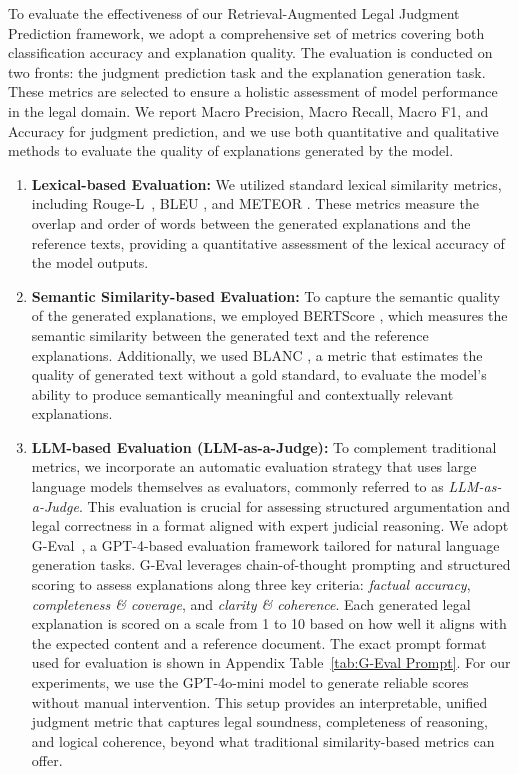 To evaluate the effectiveness of our Retrieval-Augmented Legal Judgment Prediction framework, we adopt a comprehensive set of metrics covering both classification accuracy and explanation quality. The evaluation is conducted on two fronts: the judgment prediction task and the explanation generation task. These metrics are selected to ensure a holistic assessment of model performance in the legal domain. We report Macro Precision, Macro Recall, Macro F1, and Accuracy for judgment prediction, and we use both quantitative and qualitative methods to evaluate the quality of explanations generated by the model.

\begin{enumerate}
    \item \textbf{Lexical-based Evaluation:} We utilized standard lexical similarity metrics, including Rouge-L~\cite{lin-2004-rouge}, BLEU \cite{papineni-etal-2002-bleu}, and METEOR \cite{banerjee-lavie-2005-meteor}. These metrics measure the overlap and order of words between the generated explanations and the reference texts, providing a quantitative assessment of the lexical accuracy of the model outputs.

    \item \textbf{Semantic Similarity-based Evaluation:} To capture the semantic quality of the generated explanations, we employed BERTScore \cite{BERTScore}, which measures the semantic similarity between the generated text and the reference explanations. Additionally, we used BLANC \cite{blanc}, a metric that estimates the quality of generated text without a gold standard, to evaluate the model's ability to produce semantically meaningful and contextually relevant explanations.

    \item \textbf{LLM-based Evaluation (LLM-as-a-Judge):} To complement traditional metrics, we incorporate an automatic evaluation strategy that uses large language models themselves as evaluators, commonly referred to as \textit{LLM-as-a-Judge}. This evaluation is crucial for assessing structured argumentation and legal correctness in a format aligned with expert judicial reasoning. We adopt G-Eval~\cite{liu-etal-2023-g}, a GPT-4-based evaluation framework tailored for natural language generation tasks. G-Eval leverages chain-of-thought prompting and structured scoring to assess explanations along three key criteria: \textit{factual accuracy}, \textit{completeness \& coverage}, and \textit{clarity \& coherence}. Each generated legal explanation is scored on a scale from 1 to 10 based on how well it aligns with the expected content and a reference document. The exact prompt format used for evaluation is shown in Appendix Table~\ref{tab:G-Eval Prompt}. For our experiments, we use the GPT-4o-mini model to generate reliable scores without manual intervention. This setup provides an interpretable, unified judgment metric that captures legal soundness, completeness of reasoning, and logical coherence, beyond what traditional similarity-based metrics can offer.


\end{enumerate}
